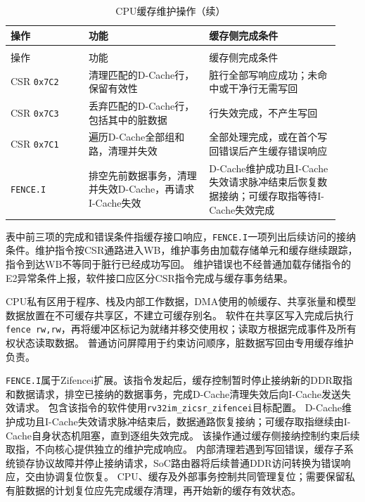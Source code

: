 \begin{reporttable}
\begin{longtable}{@{}p{0.22\linewidth}p{0.34\linewidth}p{0.37\linewidth}@{}}
\caption{CPU缓存维护操作}\label{tbl:cpu-cache-maintenance}\\
\toprule
操作 & 功能 & 缓存侧完成条件 \\
\midrule
\endfirsthead
\caption[]{CPU缓存维护操作（续）}\\
\toprule
操作 & 功能 & 缓存侧完成条件 \\
\midrule
\endhead
\bottomrule
\endfoot
CSR \texttt{0x7C2} & 清理匹配的D-Cache行，保留有效性 & 脏行全部写响应成功；未命中或干净行无需写回 \\
CSR \texttt{0x7C3} & 丢弃匹配的D-Cache行，包括其中的脏数据 & 行失效完成，不产生写回 \\
CSR \texttt{0x7C1} & 遍历D-Cache全部组和路，清理并失效 & 全部处理完成，或在首个写回错误后产生缓存错误响应 \\
\texttt{FENCE.I} & 排空先前数据事务，清理并失效D-Cache，再请求I-Cache失效 & D-Cache维护成功且I-Cache失效请求脉冲结束后恢复数据接纳；可缓存取指等待I-Cache失效完成 \\
\end{longtable}
\end{reporttable}

表中前三项的完成和错误条件指缓存接口响应，\texttt{FENCE.I}一项列出后续访问的接纳条件。维护指令按CSR通路进入WB，维护事务由加载存储单元和缓存继续跟踪，指令到达WB不等同于脏行已经成功写回。
维护错误也不经普通加载存储指令的E2异常条件上报，软件接口应区分CSR指令完成与缓存事务结果。

CPU私有区用于程序、栈及内部工作数据，DMA使用的帧缓存、共享张量和模型数据放置在不可缓存共享区，不建立可缓存别名。
软件在共享区写入完成后执行\texttt{fence rw,rw}，再将缓冲区标记为就绪并移交使用权；读取方根据完成事件及所有权状态读取数据。
普通访问屏障用于约束访问顺序，脏数据写回由专用缓存维护负责。

\texttt{FENCE.I}属于Zifencei扩展\cite{riscv-unpriv-20260120}。该指令发起后，缓存控制暂时停止接纳新的DDR取指和数据请求，排空已接纳的数据事务，完成D-Cache清理失效后向I-Cache发送失效请求。
包含该指令的软件使用\texttt{rv32im\_zicsr\_zifencei}目标配置。
D-Cache维护成功且I-Cache失效请求脉冲结束后，数据通路恢复接纳；可缓存取指继续由I-Cache自身状态机阻塞，直到逐组失效完成。
该操作通过缓存侧接纳控制约束后续取指，不向核心提供独立的维护完成响应。
内部清理若遇到写回错误，缓存子系统锁存协议故障并停止接纳请求，SoC路由器将后续普通DDR访问转换为错误响应，交由协调复位恢复。
CPU、缓存及外部事务控制共同管理复位；需要保留私有脏数据的计划复位应先完成缓存清理，再开始新的缓存有效状态。

